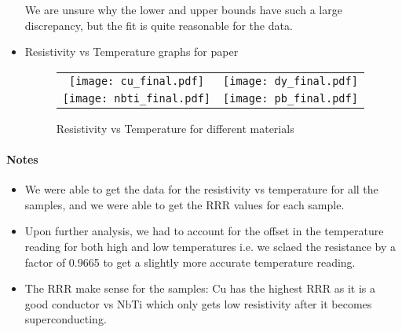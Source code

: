 \documentclass{article}
\begin{document}
\begin{itemize}
    We are unsure why the lower and upper bounds have such a large discrepancy, but the fit is quite reasonable for the data.

    \newpage
    \item Resistivity vs Temperature graphs for paper
    \begin{figure}[ht]
        \centering
        \begin{tabular}{cc}
            \texttt{[image: cu\_final.pdf]} & \texttt{[image: dy\_final.pdf]} \\
            \texttt{[image: nbti\_final.pdf]} & \texttt{[image: pb\_final.pdf]} 
        \end{tabular}
        \caption{Resistivity vs Temperature for different materials}
    \end{figure}
\end{itemize}

\paragraph{Notes}
\begin{itemize}
    \item We were able to get the data for the resistivity vs temperature for all the samples, and we were able to get the RRR values for each sample.
    \item Upon further analysis, we had to account for the offset in the temperature reading for both high and low temperatures i.e. we sclaed the resistance by a factor of 0.9665 to get a slightly more accurate temperature reading.
    \item The RRR make sense for the samples: Cu has the highest RRR as it is a good conductor vs NbTi which only gets low resistivity after it becomes superconducting.
\end{itemize}



\end{document}
